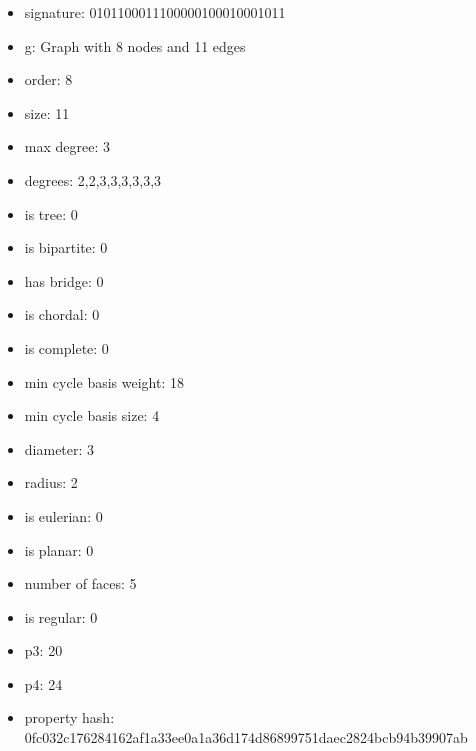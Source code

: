 \begin{itemize}
\item signature: 0101100011100000100010001011
\item g: Graph with 8 nodes and 11 edges
\item order: 8
\item size: 11
\item max degree: 3
\item degrees: 2,2,3,3,3,3,3,3
\item is tree: 0
\item is bipartite: 0
\item has bridge: 0
\item is chordal: 0
\item is complete: 0
\item min cycle basis weight: 18
\item min cycle basis size: 4
\item diameter: 3
\item radius: 2
\item is eulerian: 0
\item is planar: 0
\item number of faces: 5
\item is regular: 0
\item p3: 20
\item p4: 24
\item property hash: 0fc032c176284162af1a33ee0a1a36d174d86899751daec2824bcb94b39907ab
\end{itemize}
\newpage
\begin{figure}
\end{figure}
